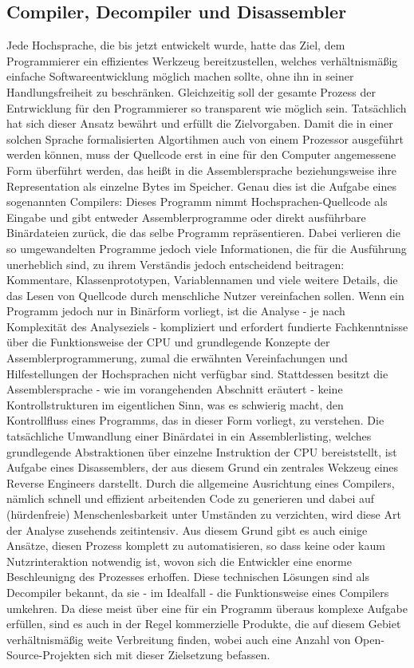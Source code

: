 \documentclass[11pt]{article} %
\begin{document}
\subsection{Compiler, Decompiler und Disassembler}
Jede Hochsprache, die bis jetzt entwickelt wurde, hatte das Ziel, dem Programmierer ein effizientes
Werkzeug bereitzustellen, welches verhältnismäßig einfache Softwareentwicklung möglich machen
sollte, ohne ihn in seiner Handlungsfreiheit zu beschränken. Gleichzeitig soll der gesamte Prozess
der Entrwicklung für den Programmierer so transparent wie möglich sein.
Tatsächlich hat sich dieser Ansatz bewährt und erfüllt die Zielvorgaben. Damit die in einer solchen
Sprache formalisierten Algortihmen auch von einem Prozessor ausgeführt werden können, muss der Quellcode
erst in eine für den Computer angemessene Form überführt werden, das heißt in die Assemblersprache
beziehungsweise ihre Representation als einzelne Bytes im Speicher. Genau dies ist die Aufgabe eines
sogenannten Compilers: Dieses Programm nimmt Hochsprachen-Quellcode als Eingabe und gibt entweder
Assemblerprogramme oder direkt ausführbare Binärdateien zurück, die das selbe Programm
repräsentieren. Dabei verlieren die so umgewandelten Programme jedoch viele Informationen, die für
die Ausführung unerheblich sind, zu ihrem Verständis jedoch entscheidend beitragen: Kommentare,
Klassenprototypen, Variablennamen und viele weitere Details, die das Lesen von Quellcode durch menschliche
Nutzer vereinfachen sollen. Wenn ein Programm jedoch nur in Binärform vorliegt,
ist die Analyse - je nach Komplexität des Analyseziels - kompliziert und
erfordert fundierte Fachkenntnisse über die Funktionsweise der CPU und grundlegende Konzepte der
Assemblerprogrammerung, zumal die erwähnten Vereinfachungen und Hilfestellungen der Hochsprachen
nicht verfügbar sind. Stattdessen besitzt die Assemblersprache - wie im vorangehenden Abschnitt
eräutert - keine Kontrollstrukturen im eigentlichen Sinn, was es schwierig macht,
den Kontrollfluss eines Programms, das in dieser Form vorliegt, zu verstehen. Die tatsächliche
Umwandlung einer Binärdatei in ein Assemblerlisting, welches grundlegende Abstraktionen über
einzelne Instruktion der CPU bereiststellt, ist Aufgabe eines Disassemblers, der aus diesem Grund
ein zentrales Wekzeug eines Reverse Engineers darstellt. Durch die allgemeine Ausrichtung eines
Compilers, nämlich schnell und effizient arbeitenden Code zu generieren und dabei auf (hürdenfreie)
Menschenlesbarkeit unter Umständen zu verzichten, wird diese Art der Analyse zusehends zeitintensiv.
Aus diesem Grund gibt es auch einige Ansätze, diesen Prozess komplett zu automatisieren, so dass
keine oder kaum Nutzrinteraktion notwendig ist, wovon sich die Entwickler eine enorme Beschleunigng
des Prozesses erhoffen. Diese technischen Lösungen sind als Decompiler bekannt, da sie - im
Idealfall - die Funktionsweise eines Compilers umkehren. Da diese meist über eine für ein Programm
überaus komplexe Aufgabe erfüllen, sind es auch in der Regel kommerzielle Produkte, die auf diesem
Gebiet verhältnismäßig weite Verbreitung finden, wobei auch eine Anzahl von Open-Source-Projekten
sich mit dieser Zielsetzung befassen.
\end{document}

